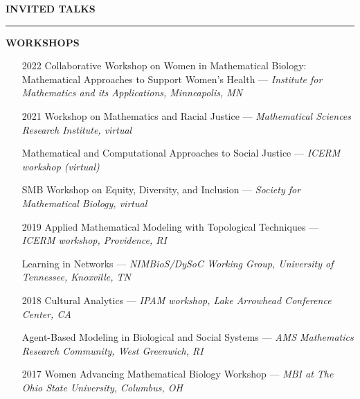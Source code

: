 \documentclass{resume} %
\renewenvironment{rSection}[1]{
\sectionskip
\textcolor{WinePurple}{\MakeUppercase{#1}}
\sectionlineskip
\hrule
\begin{list}{}{
\setlength{\leftmargin}{1.5em}
}
\item[]
}{
\end{list}
}
\begin{document}
\begin{rSection}{\bf Invited Talks}
\uppercase{\textbf{Workshops}}
\begin{itemize}
    \item[2022] Collaborative Workshop on Women in Mathematical Biology: Mathematical Approaches to Support Women's Health --- {\em Institute for Mathematics and its Applications, Minneapolis, MN}
    \item[2021] Workshop on Mathematics and Racial Justice --- {\em Mathematical Sciences Research Institute, virtual}
    \item[] Mathematical and Computational Approaches to Social Justice ---
    {\em ICERM workshop (virtual)}
    \item[] SMB Workshop on Equity, Diversity, and Inclusion ---
    {\em Society for Mathematical Biology, virtual}
    \item[2019] Applied Mathematical Modeling with Topological Techniques ---
    {\em ICERM workshop, Providence, RI}
    \item[] Learning in Networks ---
    {\em NIMBioS/DySoC Working Group, University of Tennessee, Knoxville, TN}
    \item[2018] Cultural Analytics ---
    {\em IPAM workshop, Lake Arrowhead Conference Center, CA}
    \item[] Agent-Based Modeling in Biological and Social Systems ---
    {\em AMS Mathematics Research Community, West Greenwich, RI}
    \item[2017] Women Advancing Mathematical Biology Workshop ---
    {\em MBI at The Ohio State University, Columbus, OH}
\end{itemize}

\end{rSection}
\end{document}
